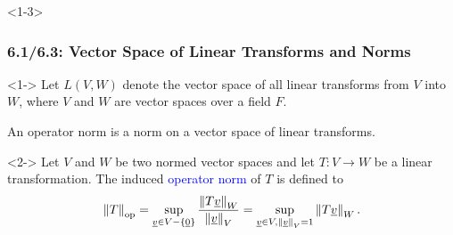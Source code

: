 \documentclass[10pt,english,aspectratio=169]{beamer}
\begin{document}
\begin{frame}<1-3> \frametitle{6.1/6.3: Vector Space of Linear Transforms and Norms}

\begin{definition}<1->
Let $L(V,W)$ denote the vector space of all linear transforms from $V$ into $W$, where $V$ and $W$ are vector spaces over a field $F$.
\end{definition}

An operator norm is a norm on a vector space of linear transforms.

\begin{definition}<2->
Let $V$ and $W$ be two normed vector spaces and let $T \colon V \rightarrow W$ be a linear transformation.
The induced \textcolor{blue}{operator norm} of $T$ is defined to
\begin{equation*}
\left\| T \right\|_{\mathrm{op}}
= \sup_{ \underline{v} \in V - \left\{ \underline{0} \right\} }
\frac{ \left\| T \underline{v} \right\|_W }{ \left\| \underline{v} \right\|_V }
= \sup_{\underline{v} \in V, \left\| \underline{v} \right\|_V = 1 }
\left\| T \underline{v} \right\|_W .
\end{equation*}
\end{definition}

\vspace{1.5mm}


\end{frame}
\end{document}
